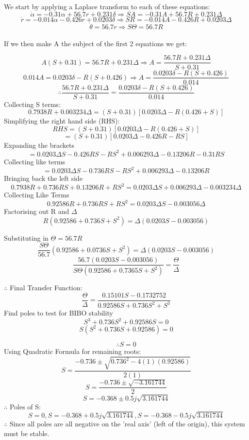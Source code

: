 
We start by applying a Laplace transform to each of these equations:
\[\dot{\alpha}=-0.31\alpha + 56.7r + 0.231\delta\Rightarrow SA =-0.31A  + 56.7R + 0.231 \Delta\] 
\[\dot{r}=-0.014\alpha - 0.426r +0.0203\delta\Rightarrow SR=-0.014A  - 0.426R +0.0203 \Delta \]
\[\dot{\theta} = 56.7r\Rightarrow S \Theta = 56.7R\]\\
If we then make A the subject of the first 2 equations we get: 

\[A(S + 0.31) =56.7R + 0.231 \Delta \Rightarrow A = \frac{56.7R +0.231 \Delta}{S + 0.31}\]
\[0.014A = 0.0203\delta - R(S+0.426) \Rightarrow A= \frac{0.0203\delta - R(S+0.426)}{0.014}\]
\[\therefore \frac{56.7R +0.231 \Delta}{S + 0.31} = \frac{0.0203\delta - R(S+0.426)}{0.014}\]
Collecting S terms:
\[0.7938R +0.003234 \Delta=(S+0.31)[0.0203\Delta - R(0.426+S)]\]
Simplifying the right hand side (RHS):
\[RHS = (S + 0.31)[0.0203\Delta - R(0.426 +S)]\]
\[=(S+0.31)[0.0203\Delta - 0.426R - RS]\]
Expanding the brackets
\[=0.0203\Delta S -0.426 RS - RS^2 +0.006293\Delta - 0.13206R -0.31RS\]
Collecting like terms
\[=0.0203 \Delta S -0.736RS - RS^2 + 0.006293\Delta - 0.13206R\]
Bringing back the left side
\[0.7938R + 0.736 RS + 0.13206R +RS^2 = 0.0203\Delta S +0.006293\Delta -  0.003234\Delta\]
Collecting Like Terms
\[0.92586R + 0.736 RS + RS^2 = 0.0203 \Delta S - 0.003056\Delta\]
Factorising out R and \(\Delta\)
\[R(0.92586 +0.736S + S^2) = \Delta (0.0203S - 0.003056)\]

Substituting in \(\Theta = 56.7 R\)
\[\frac{S\Theta}{56.7}(0.92586 + 0.0736S +S^2)=\Delta(0.0203S - 0.003056)\]
\[\frac{56.7(0.0203S - 0.003056)}{S\Theta(0.92586 + 0.7365S+S^2)} = \frac{\Theta}{\Delta}\]

\(\therefore\) Final Transfer Function:
\[\frac{\Theta}{\Delta} = \frac{0.15101S - 0.1732752}{0.92586S + 0.736S^2 + S^3}\]
Find poles to test for BIBO stability
\[S^3 + 0.736S^2 + 0.92586S = 0\]
\[S(S^2 + 0.736S + 0.92586) = 0\]

\[\therefore S = 0\] 
Using Quadratic Formula for remaining roots:
\[S = \frac{-0.736 \pm \sqrt{0.736^2 - 4(1)(0.92586)}}{2(1)}\]
\[S = \frac{-0.736 \pm \sqrt{-3.161744}}{2}\]
\[S = -0.368 \pm 0.5j \sqrt{3.161744}\]
\(\therefore\) Poles of S:
\[S = 0, S= -0.368 + 0.5j \sqrt{3.161744}, S = -0.368 - 0.5j \sqrt{3.161744}\]
\(\therefore\) Since all poles are all negative on the 'real axis' (left of the origin), this system must be stable.
